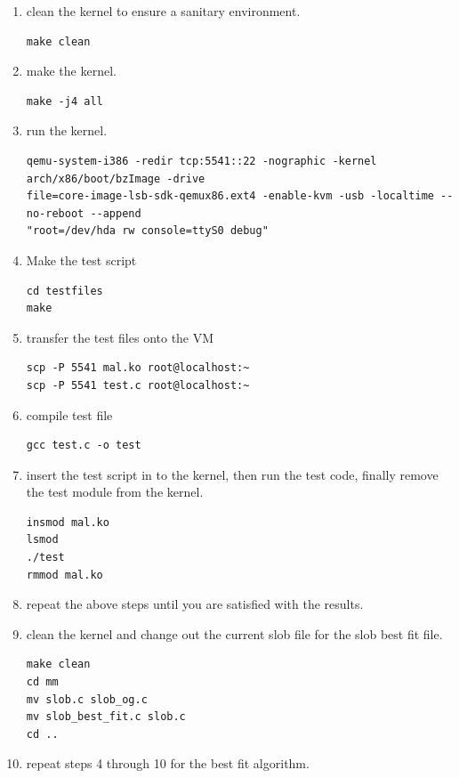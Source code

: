 \documentclass[draftclsnofoot, onecolumn, compsoc, 10pt]{IEEEtran}
\begin{document}
\begin{enumerate}
            \item clean the kernel to ensure a sanitary environment.\\
\begin{lstlisting}
make clean
\end{lstlisting}
            \item make the kernel.
\begin{lstlisting}
make -j4 all
\end{lstlisting}
            \item run the kernel.
\begin{lstlisting}
qemu-system-i386 -redir tcp:5541::22 -nographic -kernel arch/x86/boot/bzImage -drive
file=core-image-lsb-sdk-qemux86.ext4 -enable-kvm -usb -localtime --no-reboot --append
"root=/dev/hda rw console=ttyS0 debug"
\end{lstlisting}
			\item Make the test script
\begin{lstlisting}
cd testfiles
make
\end{lstlisting}
			\item transfer the test files onto the VM
\begin{lstlisting}
scp -P 5541 mal.ko root@localhost:~
scp -P 5541 test.c root@localhost:~
\end{lstlisting}
            \item compile test file
\begin{lstlisting}
gcc test.c -o test
\end{lstlisting}
			\item insert the test script in to the kernel, then run the test code, finally remove the test module from the kernel.  
\begin{lstlisting}
insmod mal.ko
lsmod
./test
rmmod mal.ko
\end{lstlisting}
        \item repeat the above steps until you are satisfied with the results.\\
        \item clean the kernel and change out the current slob file for the slob best fit file.\\
\begin{lstlisting}
make clean
cd mm
mv slob.c slob_og.c
mv slob_best_fit.c slob.c
cd ..
\end{lstlisting}
            \item repeat steps 4 through 10 for the best fit algorithm.\\
        \end{enumerate}
\end{document}
